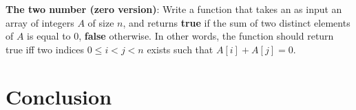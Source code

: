 \begin{exercise}
	\textbf{The two number (zero version)}: Write a function that takes an as input an array of integers $A$ of size $n$, 
	and returns \textbf{true} if the sum of two distinct elements of $A$ is equal to $0$, \textbf{false}
	otherwise. 
	In other words, the function should return true iff two indices $ 0 \leq i < j  < n$ exists such that $A[i]+A[j] = 0$.
\end{exercise}	

	
\section{Conclusion}